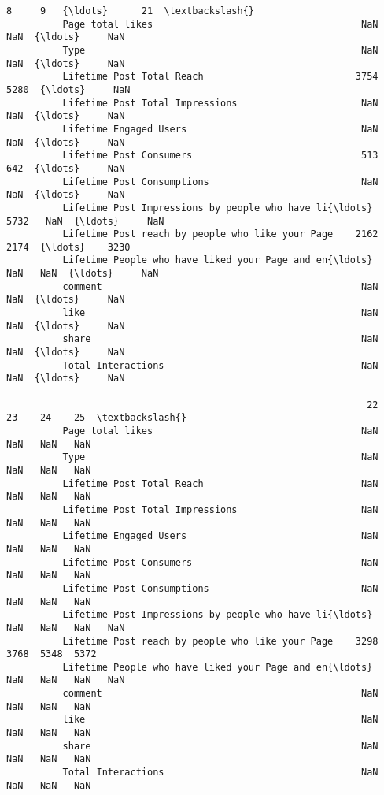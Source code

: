 \documentclass[11pt]{article}
\begin{document}
\begin{Verbatim}[commandchars=\\\{\}]
                                                                8     9   {\ldots}      21  \textbackslash{}
          Page total likes                                     NaN   NaN  {\ldots}     NaN   
          Type                                                 NaN   NaN  {\ldots}     NaN   
          Lifetime Post Total Reach                           3754  5280  {\ldots}     NaN   
          Lifetime Post Total Impressions                      NaN   NaN  {\ldots}     NaN   
          Lifetime Engaged Users                               NaN   NaN  {\ldots}     NaN   
          Lifetime Post Consumers                              513   642  {\ldots}     NaN   
          Lifetime Post Consumptions                           NaN   NaN  {\ldots}     NaN   
          Lifetime Post Impressions by people who have li{\ldots}  5732   NaN  {\ldots}     NaN   
          Lifetime Post reach by people who like your Page    2162  2174  {\ldots}    3230   
          Lifetime People who have liked your Page and en{\ldots}   NaN   NaN  {\ldots}     NaN   
          comment                                              NaN   NaN  {\ldots}     NaN   
          like                                                 NaN   NaN  {\ldots}     NaN   
          share                                                NaN   NaN  {\ldots}     NaN   
          Total Interactions                                   NaN   NaN  {\ldots}     NaN   
          
                                                                22    23    24    25  \textbackslash{}
          Page total likes                                     NaN   NaN   NaN   NaN   
          Type                                                 NaN   NaN   NaN   NaN   
          Lifetime Post Total Reach                            NaN   NaN   NaN   NaN   
          Lifetime Post Total Impressions                      NaN   NaN   NaN   NaN   
          Lifetime Engaged Users                               NaN   NaN   NaN   NaN   
          Lifetime Post Consumers                              NaN   NaN   NaN   NaN   
          Lifetime Post Consumptions                           NaN   NaN   NaN   NaN   
          Lifetime Post Impressions by people who have li{\ldots}   NaN   NaN   NaN   NaN   
          Lifetime Post reach by people who like your Page    3298  3768  5348  5372   
          Lifetime People who have liked your Page and en{\ldots}   NaN   NaN   NaN   NaN   
          comment                                              NaN   NaN   NaN   NaN   
          like                                                 NaN   NaN   NaN   NaN   
          share                                                NaN   NaN   NaN   NaN   
          Total Interactions                                   NaN   NaN   NaN   NaN   
          

\end{Verbatim}
\end{document}
